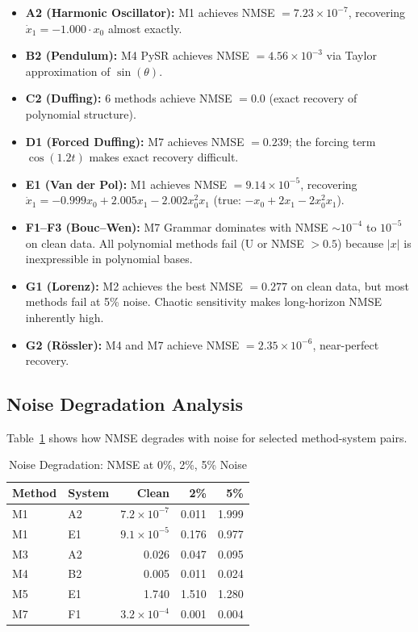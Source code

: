 \begin{itemize}
    \item \textbf{A2 (Harmonic Oscillator):} M1 achieves NMSE $= 7.23 \times 10^{-7}$, recovering $\dot{x}_1 = -1.000 \cdot x_0$ almost exactly.
    \item \textbf{B2 (Pendulum):} M4 PySR achieves NMSE $= 4.56 \times 10^{-3}$ via Taylor approximation of $\sin(\theta)$.
    \item \textbf{C2 (Duffing):} 6 methods achieve NMSE $= 0.0$ (exact recovery of polynomial structure).
    \item \textbf{D1 (Forced Duffing):} M7 achieves NMSE $= 0.239$; the forcing term $\cos(1.2t)$ makes exact recovery difficult.
    \item \textbf{E1 (Van der Pol):} M1 achieves NMSE $= 9.14 \times 10^{-5}$, recovering $\dot{x}_1 = -0.999 x_0 + 2.005 x_1 - 2.002 x_0^2 x_1$ (true: $-x_0 + 2x_1 - 2x_0^2 x_1$).
    \item \textbf{F1--F3 (Bouc--Wen):} M7 Grammar dominates with NMSE $\sim 10^{-4}$ to $10^{-5}$ on clean data. All polynomial methods fail (U or NMSE $> 0.5$) because $|x|$ is inexpressible in polynomial bases.
    \item \textbf{G1 (Lorenz):} M2 achieves the best NMSE $= 0.277$ on clean data, but most methods fail at 5\% noise. Chaotic sensitivity makes long-horizon NMSE inherently high.
    \item \textbf{G2 (R\"{o}ssler):} M4 and M7 achieve NMSE $= 2.35 \times 10^{-6}$, near-perfect recovery.
\end{itemize}

\subsection{Noise Degradation Analysis}

Table~\ref{tab:noise_degradation} shows how NMSE degrades with noise for selected method-system pairs.

\begin{table}[!ht]
\centering
\caption{Noise Degradation: NMSE at 0\%, 2\%, 5\% Noise}
\label{tab:noise_degradation}
\begin{tabular}{@{}llrrr@{}}
\toprule
\textbf{Method} & \textbf{System} & \textbf{Clean} & \textbf{2\%} & \textbf{5\%} \\
\midrule
M1 & A2 & $7.2\times10^{-7}$ & 0.011 & 1.999 \\
M1 & E1 & $9.1\times10^{-5}$ & 0.176 & 0.977 \\
M3 & A2 & 0.026 & 0.047 & 0.095 \\
M4 & B2 & 0.005 & 0.011 & 0.024 \\
M5 & E1 & 1.740 & 1.510 & 1.280 \\
M7 & F1 & $3.2\times10^{-4}$ & 0.001 & 0.004 \\
\bottomrule
\end{tabular}
\end{table}

